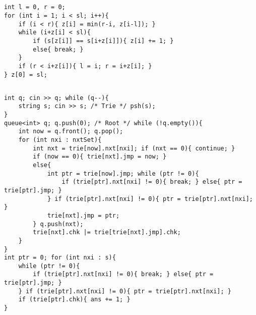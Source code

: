 \documentclass[landscape, 8pt, a4paper, oneside, twocolumn]{extarticle}
\begin{document}
\subsection{}
\begin{verbatim}
int l = 0, r = 0;
for (int i = 1; i < sl; i++){
    if (i < r){ z[i] = min(r-i, z[i-l]); }
    while (i+z[i] < sl){
        if (s[z[i]] == s[i+z[i]]){ z[i] += 1; }
        else{ break; }
    }
    if (r < i+z[i]){ l = i; r = i+z[i]; }
} z[0] = sl;
\end{verbatim}
\subsection{}
\begin{verbatim}
int q; cin >> q; while (q--){
    string s; cin >> s; /* Trie */ psh(s);
}
queue<int> q; q.push(0); /* Root */ while (!q.empty()){
    int now = q.front(); q.pop();
    for (int nxi : nxtSet){
        int nxt = trie[now].nxt[nxi]; if (nxt == 0){ continue; }
        if (now == 0){ trie[nxt].jmp = now; }
        else{
            int ptr = trie[now].jmp; while (ptr != 0){
                if (trie[ptr].nxt[nxi] != 0){ break; } else{ ptr = trie[ptr].jmp; }
            } if (trie[ptr].nxt[nxi] != 0){ ptr = trie[ptr].nxt[nxi]; }
            trie[nxt].jmp = ptr;
        } q.push(nxt);
        trie[nxt].chk |= trie[trie[nxt].jmp].chk;
    }
}
int ptr = 0; for (int nxi : s){
    while (ptr != 0){
        if (trie[ptr].nxt[nxi] != 0){ break; } else{ ptr = trie[ptr].jmp; }
    } if (trie[ptr].nxt[nxi] != 0){ ptr = trie[ptr].nxt[nxi]; }
    if (trie[ptr].chk){ ans += 1; }
}
\end{verbatim}
\end{document}
